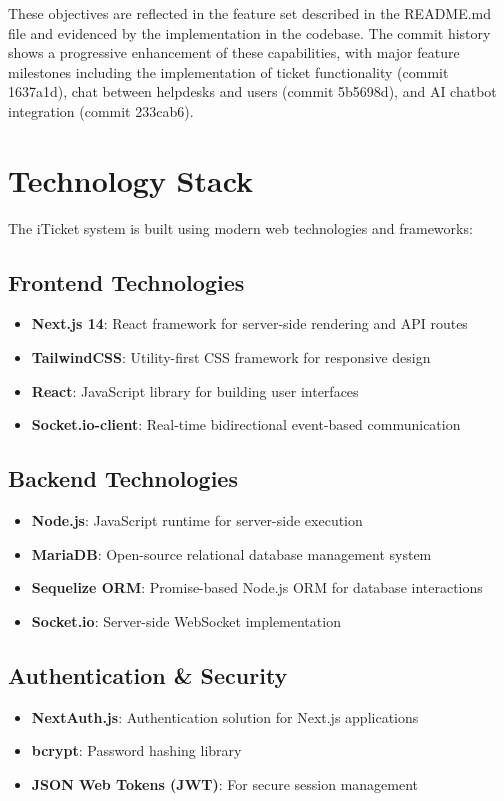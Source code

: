 \documentclass[12pt,a4paper]{article}
\begin{document}
These objectives are reflected in the feature set described in the README.md file and evidenced by the implementation in the codebase. The commit history shows a progressive enhancement of these capabilities, with major feature milestones including the implementation of ticket functionality (commit 1637a1d), chat between helpdesks and users (commit 5b5698d), and AI chatbot integration (commit 233cab6).

\section{Technology Stack}

The iTicket system is built using modern web technologies and frameworks:

\subsection{Frontend Technologies}
\begin{itemize}
    \item \textbf{Next.js 14}: React framework for server-side rendering and API routes
    \item \textbf{TailwindCSS}: Utility-first CSS framework for responsive design
    \item \textbf{React}: JavaScript library for building user interfaces
    \item \textbf{Socket.io-client}: Real-time bidirectional event-based communication
\end{itemize}

\subsection{Backend Technologies}
\begin{itemize}
    \item \textbf{Node.js}: JavaScript runtime for server-side execution
    \item \textbf{MariaDB}: Open-source relational database management system
    \item \textbf{Sequelize ORM}: Promise-based Node.js ORM for database interactions
    \item \textbf{Socket.io}: Server-side WebSocket implementation
\end{itemize}

\subsection{Authentication \& Security}
\begin{itemize}
    \item \textbf{NextAuth.js}: Authentication solution for Next.js applications
    \item \textbf{bcrypt}: Password hashing library
    \item \textbf{JSON Web Tokens (JWT)}: For secure session management
\end{itemize}
\end{document}
